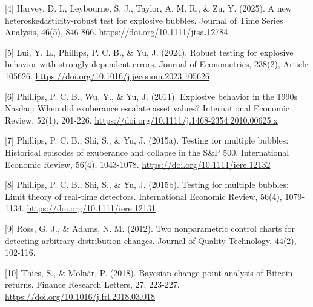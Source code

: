 \documentclass[11pt,a4paper,onecolumn]{article}
\newenvironment{reportreference}{\begingroup\small\setlength{\parskip}{5pt}\leftskip=5mm\parindent=-5mm}{\par\endgroup}
\begin{document}
\begin{reportreference}
[4] Harvey, D. I., Leybourne, S. J., Taylor, A. M. R., \& Zu, Y. (2025). A new heteroskedasticity-robust test for explosive bubbles. Journal of Time Series Analysis, 46(5), 846-866. \url{https://doi.org/10.1111/jtsa.12784}
\end{reportreference}

\begin{reportreference}
[5] Lui, Y. L., Phillips, P. C. B., \& Yu, J. (2024). Robust testing for explosive behavior with strongly dependent errors. Journal of Econometrics, 238(2), Article 105626. \url{https://doi.org/10.1016/j.jeconom.2023.105626}
\end{reportreference}

\begin{reportreference}
[6] Phillips, P. C. B., Wu, Y., \& Yu, J. (2011). Explosive behavior in the 1990s Nasdaq: When did exuberance escalate asset values? International Economic Review, 52(1), 201-226. \url{https://doi.org/10.1111/j.1468-2354.2010.00625.x}
\end{reportreference}

\begin{reportreference}
[7] Phillips, P. C. B., Shi, S., \& Yu, J. (2015a). Testing for multiple bubbles: Historical episodes of exuberance and collapse in the S\&P 500. International Economic Review, 56(4), 1043-1078. \url{https://doi.org/10.1111/iere.12132}
\end{reportreference}

\begin{reportreference}
[8] Phillips, P. C. B., Shi, S., \& Yu, J. (2015b). Testing for multiple bubbles: Limit theory of real-time detectors. International Economic Review, 56(4), 1079-1134. \url{https://doi.org/10.1111/iere.12131}
\end{reportreference}

\begin{reportreference}
[9] Ross, G. J., \& Adams, N. M. (2012). Two nonparametric control charts for detecting arbitrary distribution changes. Journal of Quality Technology, 44(2), 102-116.
\end{reportreference}

\begin{reportreference}
[10] Thies, S., \& Molnár, P. (2018). Bayesian change point analysis of Bitcoin returns. Finance Research Letters, 27, 223-227. \url{https://doi.org/10.1016/j.frl.2018.03.018}
\end{reportreference}
\end{document}

